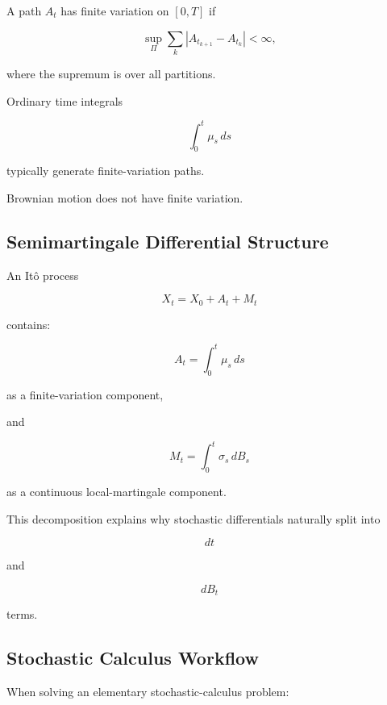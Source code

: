 A path \(A_t\) has finite variation on \([0,T]\) if

\[
\sup_{\Pi}
\sum_k
|A_{t_{k+1}}-A_{t_k}|
<
\infty,
\]

where the supremum is over all partitions.

Ordinary time integrals

\[
\int_0^t
\mu_s\,ds
\]

typically generate finite-variation paths.

Brownian motion does not have finite variation.

\subsection{Semimartingale Differential Structure}
\label{subsec:semimartingale-differential}

An It\^o process

\[
X_t
=
X_0
+
A_t
+
M_t
\]

contains:

\[
\boxed{
A_t
=
\int_0^t
\mu_s\,ds
}
\]

as a finite-variation component,

and

\[
\boxed{
M_t
=
\int_0^t
\sigma_s\,dB_s
}
\]

as a continuous local-martingale component.

This decomposition explains why stochastic differentials naturally split
into

\[
dt
\]

and

\[
dB_t
\]

terms.

\subsection{Stochastic Calculus Workflow}
\label{subsec:stochastic-calculus-workflow}

When solving an elementary stochastic-calculus problem:


